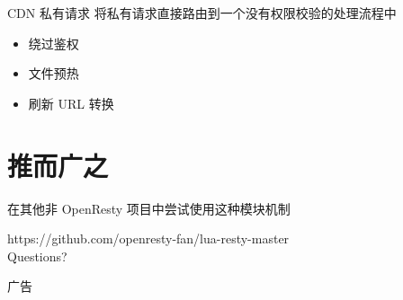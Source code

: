 \documentclass[aspectratio=32]{beamer}
\begin{document}
\begin{frame}[fragile]{CDN 私有请求}
将私有请求直接路由到一个没有权限校验的处理流程中
\begin{itemize}
  \item 绕过鉴权
  \item 文件预热
  \item 刷新 URL 转换
\end{itemize}
\end{frame}

\section{推而广之}

\begin{frame}[standout]
在其他非 OpenResty 项目中尝试使用这种模块机制
\end{frame}

\begin{frame}
\begin{center}
https://github.com/openresty-fan/lua-resty-master \\[2em]
Questions?
\end{center}
\end{frame}

\begin{frame}[standout]
广告
\end{frame}
\end{document}
